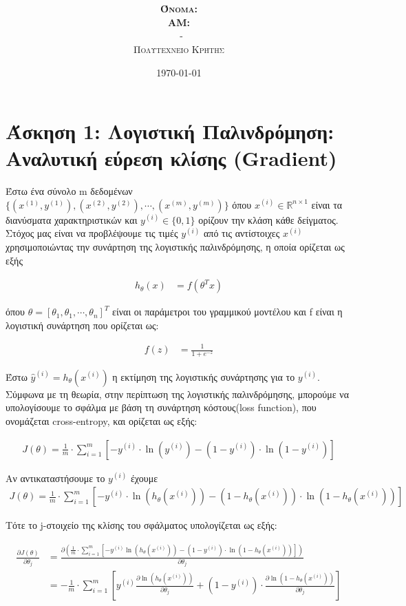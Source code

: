 \documentclass{article}
\title{\underline{\textbf{\assignmentNumber}}}
\author{\textsc{\textbf{Όνομα:}}  \studentName\\
		\textsc{\textbf{ΑΜ:}}  \studentNumber\\
		\course \ - \courseName\\ 
		\textsc{Πολυτεχνείο Κρήτης}
}
\date{\today}
\begin{document}
	\maketitle
\section*{Άσκηση 1: Λογιστική Παλινδρόμηση: Αναλυτική εύρεση κλίσης (Gradient)}
	Έστω ένα σύνολο m δεδομένων $\{(x^{(1)},y^{(1)}), (x^{(2)},y^{(2)}), \cdots, (x^{(m)},y^{(m)})\}$ όπου $x^{(i)} \in \mathbb{R}^{n \times 1}$ είναι τα διανύσματα χαρακτηριστικών και $y^{(i)} \in \{0,1\}$ ορίζουν την κλάση κάθε δείγματος. Στόχος μας είναι να προβλέψουμε τις τιμές $y^{(i)}$ από τις αντίστοιχες $x^{(i)}$ χρησιμοποιώντας την συνάρτηση της λογιστικής παλινδρόμησης, η οποία ορίζεται ως εξής

	
	\begin{align*}
		h_{θ}(x) &= f(θ^{Τ}x)
	\end{align*}

	\noindent
	όπου $θ = [θ_{1}, θ_{1}, \cdots , θ_{n}]^T$ είναι οι παράμετροι του γραμμικού μοντέλου και f είναι η λογιστική συνάρτηση που ορίζεται ως:
	
	\begin{align*}
		f(z) &= \frac{1}{1 + e^{-z}}
	\end{align*}

	\noindent
	Έστω $\hat{y}^{(i)} = h_{θ}(x^{(i)})$ η εκτίμηση της λογιστικής συνάρτησης για το $y^{(i)}$. Σύμφωνα με τη θεωρία, στην περίπτωση	της λογιστικής παλινδρόμησης, μπορούμε να υπολογίσουμε το σφάλμα με βάση τη συνάρτηση	κόστους(loss function), που ονομάζεται cross-entropy, και ορίζεται ως εξής: 
	
	\begin{align*}
		J(θ) = \frac{1}{m} \cdot \sum_{i=1}^{m}  [-y^{(i)} \cdot \ln(y^{(i)}) - (1-y^{(i)}) \cdot \ln (1 - y^{(i)})]
	\end{align*}


	\noindent
	Aν αντικαταστήσουμε το $y^{(i)}$ έχουμε
	\begin{align*}
		J(θ) = \frac{1}{m} \cdot \sum_{i=1}^{m} [-y^{(i)} \cdot \ln( h_{θ}(x^{(i)}) ) - (1 - h_{θ}(x^{(i)})) \cdot \ln (1 - h_{θ}(x^{(i)}))]
	\end{align*}
	
	
	\noindent
	Τότε το j-στοιχείο της κλίσης του σφάλματος υπολογίζεται ως εξής: 
	 
	\begin{align*}
		\frac{\partial J(θ)}{\partial θ_{j}} &= 
		\frac{\partial \left(\frac{1}{m} \cdot \sum_{i=1}^{m} [ -y^{(i)} \ln( h_{θ}(x^{(i)}) ) - 
			(1 - y^{(i)}) \cdot \ln (1 - h_{θ}(x^{(i)})) ] \right)}{\partial θ_{j}}  \\
		&= -\frac{1}{m} \cdot \sum_{i=1}^{m} \left[ y^{(i)} \frac{ \partial \ln( h_{θ}(x^{(i)}) )}{\partial θ_{j}} + 
			(1 - y^{(i)}) \cdot \frac{ \partial \ln (1 - h_{θ}(x^{(i)}))}{\partial θ_{j}} \right]
	\end{align*}
\end{document}
